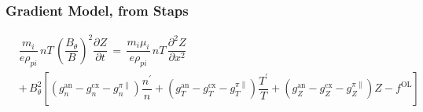\documentclass[a4paper,8pt]{article}
\begin{document}
\normalsize

\subsubsection{Gradient Model, from
Staps}\label{gradient-model-from-staps}

\small

\begin{align}
    &\dfrac{m_i}{e \rho_{pi}} \,n T\, \left(\dfrac{B_\theta}{B}\right)^2 \dfrac{\partial Z}{\partial t} \,=\, \dfrac{m_i \mu_i}{e \rho_{pi}} \,n T\, \dfrac{\partial^2 Z}{\partial x^2} \\
    &+\, B_\theta^2 \left[\left(g_n^\text{an} - g_n^\text{cx} - g_n^{\pi\parallel}\right) \dfrac{n^\prime}{n} + \left(g_T^\text{an} - g_T^\text{cx} - g_T^{\pi\parallel}\right) \dfrac{T^\prime}{T} + \left(g_Z^\text{an} - g_Z^\text{cx} - g_Z^{\pi\parallel}\right) Z - f^\text{OL}\right]
\end{align}

\normalsize
\end{document}
